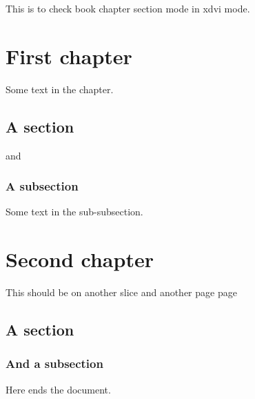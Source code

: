 \documentclass{book}
\begin{document}
This is to check book chapter section mode in xdvi mode.

\chapter {First chapter}

Some text in the chapter.   
 
\section {A section}
  
and

\subsection {A subsection} 

Some text in the sub-subsection. 


\chapter{Second chapter}
This should be on another slice and another page page 


\section {A section}

\subsection {And a subsection}

Here ends the document.
\end{document}
